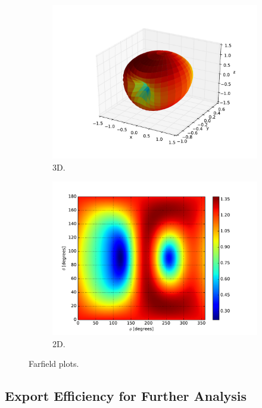 \documentclass[10pt]{article}
\begin{document}
\begin{figure}[htbp]
    \centering
    \begin{subfigure}{0.49\linewidth}
        \centering
        \includegraphics[scale=0.5]{examples/ex3_3dfarfield.pdf}
        \caption{3D.}
    \end{subfigure}
    \hfill
    \begin{subfigure}{0.49\linewidth}
        \centering
        \includegraphics[scale=0.5]{examples/ex3_2dfarfield.pdf}
        \caption{2D.}
    \end{subfigure}
    \caption{Farfield plots.}
    \label{fig:example3}
\end{figure}

\clearpage
\subsection{Export Efficiency for Further Analysis}
\end{document}
